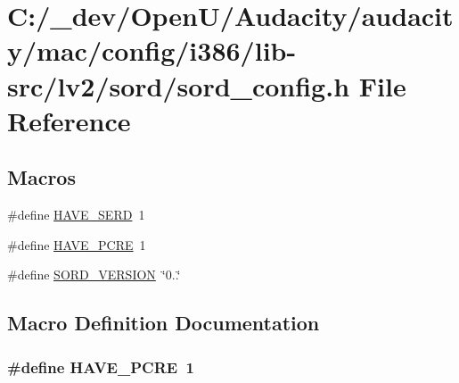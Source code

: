 \hypertarget{mac_2config_2i386_2lib-src_2lv2_2sord_2sord__config_8h}{}\section{C\+:/\+\_\+dev/\+Open\+U/\+Audacity/audacity/mac/config/i386/lib-\/src/lv2/sord/sord\+\_\+config.h File Reference}
\label{mac_2config_2i386_2lib-src_2lv2_2sord_2sord__config_8h}
\subsection*{Macros}
\begin{DoxyCompactItemize}
\item 
\#define \hyperlink{mac_2config_2i386_2lib-src_2lv2_2sord_2sord__config_8h_af73dc1c61a8c088c96f3a0f3a85b75dd}{H\+A\+V\+E\+\_\+\+S\+E\+RD}~1
\item 
\#define \hyperlink{mac_2config_2i386_2lib-src_2lv2_2sord_2sord__config_8h_a3db59589be9be679100b2a21a88572fe}{H\+A\+V\+E\+\_\+\+P\+C\+RE}~1
\item 
\#define \hyperlink{mac_2config_2i386_2lib-src_2lv2_2sord_2sord__config_8h_ab9ed0ad193c2d4ad08433bb36fff63dd}{S\+O\+R\+D\+\_\+\+V\+E\+R\+S\+I\+ON}~\char`\"{}0..\char`\"{}
\end{DoxyCompactItemize}


\subsection{Macro Definition Documentation}
\subsubsection[{\texorpdfstring{H\+A\+V\+E\+\_\+\+P\+C\+RE}{HAVE_PCRE}}]{\setlength{\rightskip}{0pt plus 5cm}\#define H\+A\+V\+E\+\_\+\+P\+C\+RE~1}\hypertarget{mac_2config_2i386_2lib-src_2lv2_2sord_2sord__config_8h_a3db59589be9be679100b2a21a88572fe}{}\label{mac_2config_2i386_2lib-src_2lv2_2sord_2sord__config_8h_a3db59589be9be679100b2a21a88572fe}


